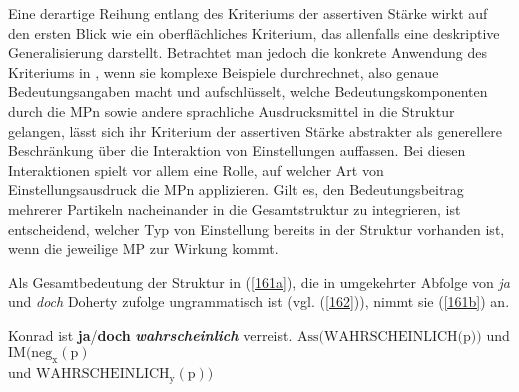 Eine derartige Reihung entlang des Kriteriums der assertiven Stärke wirkt auf den ersten Blick wie ein oberflächliches Kriterium, das allenfalls eine deskriptive Generalisierung darstellt. Betrachtet man jedoch die konkrete Anwendung des Kriteriums in \citet{Doherty1985}, wenn sie komplexe Beispiele durchrechnet, also genaue Bedeutungsangaben macht und aufschlüsselt, welche Bedeutungskomponenten durch die MPn sowie andere sprachliche Ausdrucksmittel in die Struktur gelangen, lässt sich ihr Kriterium der assertiven Stärke abstrakter als generellere Beschränkung über die Interaktion von Einstellungen auffassen. Bei diesen Interaktionen spielt vor allem eine Rolle, auf welcher Art von Einstellungsausdruck die MPn applizieren. Gilt es, den Bedeutungsbeitrag mehrerer Partikeln nacheinander in die Gesamtstruktur zu integrieren, ist entscheidend, welcher Typ von Einstellung bereits in der Struktur vorhanden ist, wenn die jeweilige MP zur Wirkung kommt.

Als Gesamtbedeutung der Struktur in (\ref{161a}), die in umgekehrter Abfolge von \textit{ja} und \textit{doch} Doherty zufolge ungrammatisch ist (vgl. (\ref{162})), nimmt sie (\ref{161b}) an.

\begin{exe}
	\ex\label{161} 
		\begin{xlist}	
			\ex\label{161a} Konrad ist \textbf{ja}/\textbf{doch} \textbf{\textit{wahrscheinlich}} verreist.
			\ex\label{161b} $\textrm{Ass(WAHRSCHEINLICH(p)})$ und $\textrm{IM(neg}_{\textrm{x}}(\textrm{p})$ \\ und $\textrm{WAHRSCHEINLICH}_{\textrm{y}}(\textrm{p}))$
			\hfill\hbox {\citet[85]{Doherty1985}}
		\end{xlist}
\end{exe}

